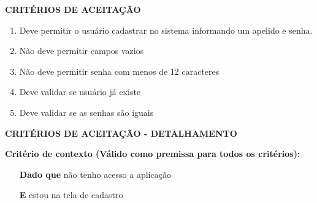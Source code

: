 \textbf{CRITÉRIOS DE ACEITAÇÃO}

\begin{enumerate}
    \item Deve permitir o usuário cadastrar no sistema informando um apelido e senha.
    \item Não deve permitir campos vazios
    \item Não deve permitir senha com menos de 12 caracteres
    \item Deve validar se usuário já existe
    \item Deve validar se as senhas são iguais
\end{enumerate}

\textbf{CRITÉRIOS DE ACEITAÇÃO - DETALHAMENTO}

\textbf{Critério de contexto (Válido como premissa para todos os critérios):}

\begin{itemize}
    \item[\textbf{Dado que}] não tenho acesso a aplicação
    \item[\textbf{E}] estou na tela de cadastro
\end{itemize}


